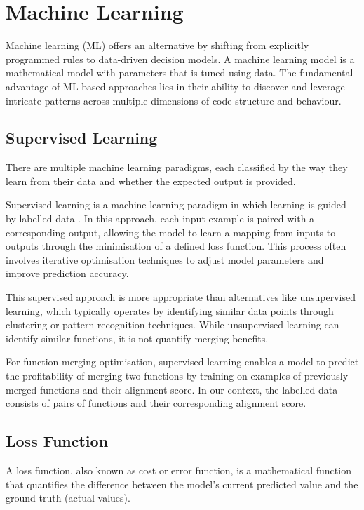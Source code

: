 \section{Machine Learning} \label{ML}
Machine learning (ML) offers an alternative by shifting from explicitly programmed rules to data-driven decision models. A machine learning model is a mathematical model with parameters that is tuned using data. The fundamental advantage of ML-based approaches lies in their ability to discover and leverage intricate patterns across multiple dimensions of code structure and behaviour.

\subsection{Supervised Learning}
There are multiple machine learning paradigms, each classified by the way they learn from their data and whether the expected output is provided.

Supervised learning is a machine learning paradigm in which learning is guided by labelled data \cite{MLParadigms} \cite{SupervisedLearningAndTrainingProcess}. In this approach, each input example is paired with a corresponding output, allowing the model to learn a mapping from inputs to outputs through the minimisation of a defined loss function. This process often involves iterative optimisation techniques to adjust model parameters and improve prediction accuracy. 

This supervised approach is more appropriate than alternatives like unsupervised learning, which typically operates by identifying similar data points through clustering or pattern recognition techniques. While unsupervised learning can identify similar functions, it is not quantify merging benefits.

For function merging optimisation, supervised learning enables a model to predict the profitability of merging two functions by training on examples of previously merged functions and their alignment score. In our context, the labelled data consists of pairs of functions and their corresponding alignment score.

\subsection{Loss Function} \label{ML:LossFunction}
A loss function, also known as cost or error function, is a mathematical function that quantifies the difference between the model's current predicted value and the ground truth (actual values).

